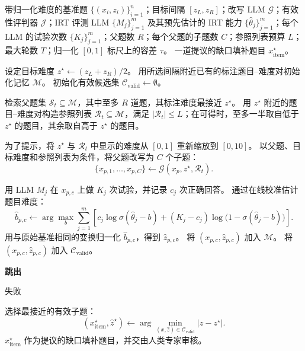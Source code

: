\newpage
\begin{algorithm}[t]
\caption{\textsc{BenchFill}}
\label{alg:gap_filling}
\begin{algorithmic}[1]
\Require 带归一化难度的基准题 $\{(x_i,z_i)\}_{i=1}^n$；目标间隔 $[z_L,z_R]$；改写 LLM $\mathcal{G}$；有效性评判器 $\mathcal{J}$；IRT 评测 LLM $\{M_j\}_{j=1}^m$ 及其预先估计的 IRT 能力 $\{\hat{\theta}_j\}_{j=1}^m$；每个 LLM 的试验次数 $\{K_j\}_{j=1}^m$；父题数 $R$；每个父题的子题数 $C$；参照列表预算 $L$；最大轮数 $T$；归一化 $[0,1]$ 标尺上的容差 $\tau$。
\Ensure 一道提议的缺口填补题目 $x^\star_{\mathrm{item}}$。

\State 设定目标难度 $z^\star \gets (z_L+z_R)/2$。
\State 用所选间隔附近已有的标注题目--难度对初始化记忆 $\mathcal{M}$。
\State 初始化有效候选集 $\mathcal{C}_{\mathrm{valid}} \gets \emptyset$。

    \State 检索父题集 $\mathcal{S}_t \subseteq \mathcal{M}$，其中至多 $R$ 道题，其标注难度最接近 $z^\star$。
    \State 用 $z^\star$ 附近的题目--难度对构造参照列表 $\mathcal{R}_t \subseteq \mathcal{M}$，满足 $|\mathcal{R}_t|\le L$；在可得时，至多一半取自低于 $z^\star$ 的题目，其余取自高于 $z^\star$ 的题目。
    
        \State 为了提示，将 $z^\star$ 与 $\mathcal{R}_t$ 中显示的难度从 $[0,1]$ 重新缩放到 $[0,10]$。
        \State 以父题、目标难度和参照列表为条件，将父题改写为 $C$ 个子题：
        \[
        \{x_{p,1},\dots,x_{p,C}\}
        \gets
        \mathcal{G}(x_p, z^\star, \mathcal{R}_t).
        \]
        
                    \State 用 LLM $M_j$ 在 $x_{p,c}$ 上做 $K_j$ 次试验，并记录 $c_j$ 次正确回答。
                \EndFor
                \State 通过在线校准估计题目难度：
                \[
                \hat{b}_{p,c}
                \gets
                \arg\max_b
                \sum_{j=1}^{m}
                \left[
                c_j\log \sigma(\hat{\theta}_j-b)
                +
                (K_j-c_j)\log\bigl(1-\sigma(\hat{\theta}_j-b)\bigr)
                \right].
                \]
                \State 用与原始基准相同的变换归一化 $\hat{b}_{p,c}$，得到 $\hat{z}_{p,c}$。
                \State 将 $(x_{p,c},\hat{z}_{p,c})$ 加入 $\mathcal{M}$。
                \State 将 $(x_{p,c},\hat{z}_{p,c})$ 加入 $\mathcal{C}_{\mathrm{valid}}$。
            \EndIf
        \EndFor
    \EndFor
    
        \State \textbf{跳出}
    \EndIf
\EndFor

    \State \Return 失败
\EndIf

\State 选择最接近的有效子题：
\[
(x^\star_{\mathrm{item}},\hat{z}^\star)
\gets
\arg\min_{(x,\hat{z})\in \mathcal{C}_{\mathrm{valid}}}
|\hat{z}-z^\star|.
\]
\State \Return $x^\star_{\mathrm{item}}$ 作为提议的缺口填补题目，并交由人类专家审核。
\end{algorithmic}
\end{algorithm}

